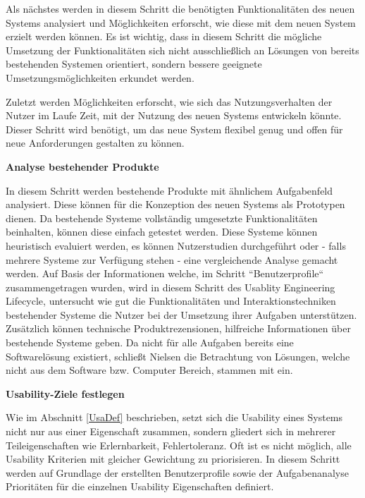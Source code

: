 \cite[S.~77]{Nielsen1994} Als nächstes werden in diesem Schritt die benötigten Funktionalitäten des neuen Systems analysiert und Möglichkeiten erforscht, wie diese mit dem neuen System erzielt werden können. 
Es ist wichtig, dass in diesem Schritt die mögliche Umsetzung der Funktionalitäten sich nicht ausschließlich an Lösungen von bereits bestehenden Systemen orientiert, sondern 
bessere geeignete Umsetzungsmöglichkeiten erkundet werden.

\cite[S.~78]{Nielsen1994} Zuletzt werden Möglichkeiten erforscht, wie sich das Nutzungsverhalten der Nutzer im Laufe Zeit, mit der Nutzung des neuen Systems entwickeln könnte. Dieser Schritt wird  
benötigt, um das neue System flexibel genug und offen für neue Anforderungen gestalten zu können. 

\vspace{5mm} 
\textbf{Analyse bestehender Produkte} 
 
\cite[S.~78]{Nielsen1994} In diesem Schritt werden bestehende Produkte mit ähnlichem Aufgabenfeld analysiert. Diese können für die Konzeption des neuen Systems als Prototypen dienen. 
Da bestehende Systeme vollständig umgesetzte Funktionalitäten beinhalten, können diese einfach getestet werden.    
Diese Systeme können heuristisch evaluiert werden, es können Nutzerstudien durchgeführt oder - falls mehrere Systeme zur Verfügung stehen - eine vergleichende Analyse gemacht werden. Auf Basis der Informationen welche, im Schritt ``Benutzerprofile`` zusammengetragen wurden, wird in diesem Schritt des Usablity Engineering Lifecycle, untersucht wie gut die Funktionalitäten und Interaktionstechniken 
bestehender Systeme die Nutzer bei der Umsetzung ihrer Aufgaben unterstützen. Zusätzlich können technische Produktrezensionen, hilfreiche Informationen über bestehende Systeme geben. 
Da nicht für alle Aufgaben bereits eine Softwarelösung existiert, schließt Nielsen die Betrachtung von Lösungen, welche nicht aus dem Software bzw. Computer Bereich, stammen mit ein. 

\vspace{5mm} 
\textbf{Usability-Ziele festlegen} 

Wie im Abschnitt \ref{UsaDef} beschrieben, setzt sich die Usability eines Systems nicht nur aus einer Eigenschaft zusammen, sondern gliedert sich in mehrerer Teileigenschaften wie Erlernbarkeit, Fehlertoleranz. \cite[S.~79]{Nielsen1994} Oft ist es nicht möglich, alle Usability Kriterien mit gleicher Gewichtung zu priorisieren. In diesem Schritt werden auf Grundlage der erstellten Benutzerprofile sowie der Aufgabenanalyse Prioritäten für die einzelnen Usability Eigenschaften definiert. 

